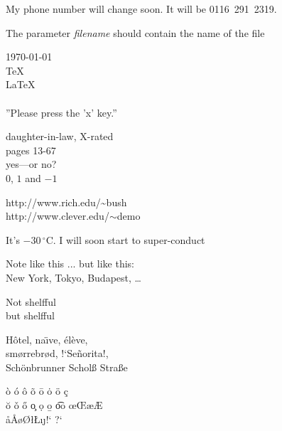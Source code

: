 \documentclass[a4paper, 11pt]{article}
\begin{document}
My phone number will change soon.
It will be \mbox{0116 291 2319}.

The parameter 
\mbox{\emph{filename}} should
contain the name of the file



\today
\\

\TeX
\\

\LaTeX
\\

\LaTeXe
\\




''Please press the 'x' key.''




daughter-in-law, X-rated\\
pages 13-67\\
yes---or no?\\
$0$, $1$ and $-1$
\newline



http://www.rich.edu/\~{}bush \\
http://www.clever.edu/$\sim$demo
\newline




It's $-30\,^{\circ}\mathrm{C}$.
I will soon start to super-conduct
\newline






Note like this ... but like this: \\
New York, Tokyo, Budapest, \ldots
\newline




\Large Not shelfful\\
but shelf\mbox{}ful
\newline



H\^otel, na\"\i ve, \'el\`eve,\\
sm\o rrebr\o d, !`Se\~norita!,\\
Sch\"onbrunner Schol\ss{}
Stra\ss e
\newline


\`o \'o \^o \~o 
\=o \.o \"o \c c\\
\u o \v o \H o \c o
\d o \b o \t oo
\oe \OE \ae \AE\\
\aa \AA \o \O \l \L \i \j !` ?`
\end{document}
